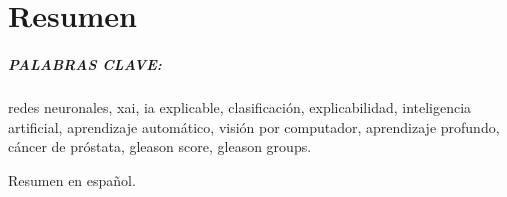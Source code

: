 %


\chapter{Resumen}

\paragraph*{PALABRAS CLAVE:} redes neuronales, xai, ia explicable, clasificación, explicabilidad, inteligencia artificial, aprendizaje automático, visión por computador, aprendizaje profundo, cáncer de próstata, gleason score, gleason groups.

Resumen en español.
\thispagestyle{empty}

\endinput
